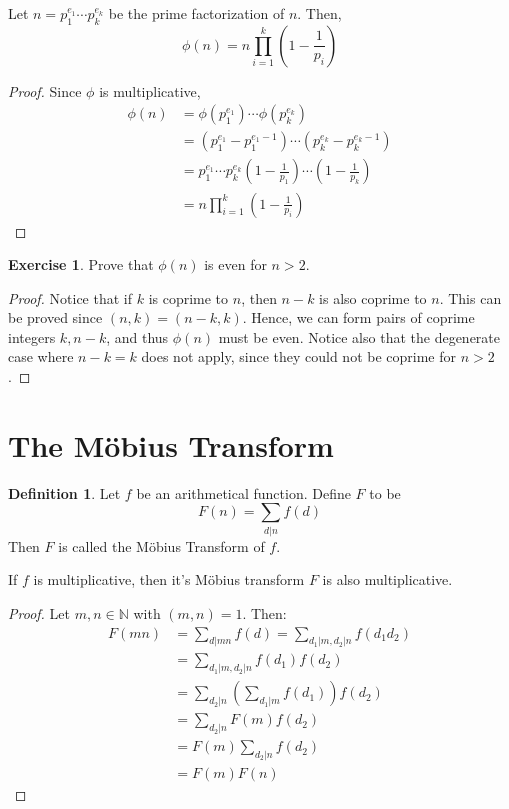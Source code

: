 \documentclass[12pt,letterpaper]{book}
\theoremstyle{definition}
\newtheorem{definition}{Definition} %
\newtheorem*{exercise}{Exercise}
\newcommand{\N}{\mathbb{N}}
\begin{document}
\begin{theorem}
  Let $n = p_1^{e_1} \cdots p_k ^{e_k}$ be the prime factorization of $n$. Then,
  \[\phi(n) = n \prod_{i=1}^k \left (1 - \frac{1}{p_i}\right)\]
\end{theorem}
\begin{proof}
  Since $\phi$ is multiplicative,
  \begin{align*}
    \phi(n) &= \phi(p_1^{e_1}) \cdots \phi(p_k^{e_k}) \\
            &= (p_1^{e_1} - p_1^{e_1-1}) \cdots (p_k^{e_k} - p_k ^{e_k-1}) \\         &= p_1^{e_1} \cdots p_k^{e_k} \left(1-\frac{1}{p_1} \right)\cdots \left (1-\frac{1}{p_k} \right) \\
            &= n \prod_{i=1}^k \left( 1-\frac{1}{p_i} \right)
  \end{align*}
\end{proof}

\begin{exercise}
  Prove that $\phi(n)$ is even for $n > 2$. 
\end{exercise}
\begin{proof}
  Notice that if $k$ is coprime to $n$, then $n-k$ is also coprime to $n$. This can be proved since $(n,k) = (n-k,k)$. Hence, we can form pairs of coprime integers $k,n-k$, and thus $\phi(n)$ must be even. Notice also that the degenerate case where $n-k = k$ does not apply, since they could not be coprime for $n > 2$.
\end{proof}

\section{The M\"{o}bius Transform}

\begin{definition}
  Let $f$ be an arithmetical function. Define $F$ to be
  \[F(n) = \sum_{d|n} f(d)\]
  Then $F$ is called the M\"{o}bius Transform of $f$.
\end{definition}

\begin{theorem}
  If $f$ is multiplicative, then it's M\"{o}bius transform $F$ is also multiplicative.
\end{theorem}
\begin{proof}
  Let $m,n \in \N$ with $(m,n) = 1$. Then:
  \begin{align*}
    F(mn) &= \sum_{d|mn} f(d) = \sum_{d_1|m,d_2|n} f(d_1d_2) \\
          &= \sum_{d_1|m,d_2|n} f(d_1) f(d_2) \\
          &= \sum_{d_2|n} \left( \sum_{d_1|m}f(d_1) \right) f(d_2) \\
          &= \sum_{d_2|n} F(m) f(d_2) \\
          &= F(m) \sum_{d_2|n} f(d_2) \\
          &= F(m) F(n)
  \end{align*}
\end{proof}
\end{document}
